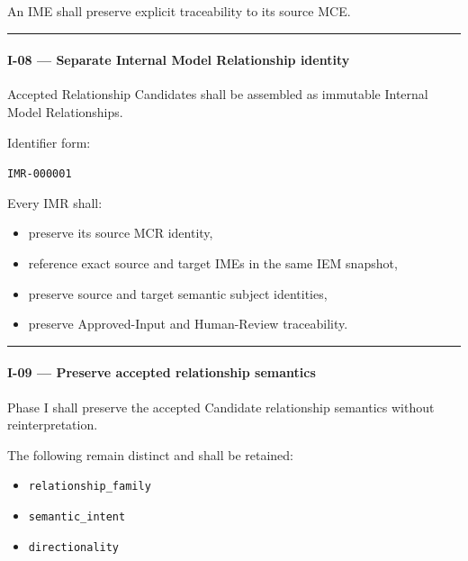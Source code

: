 An IME shall preserve explicit traceability to its source MCE.

\begin{center}\rule{0.5\linewidth}{0.5pt}\end{center}

\hypertarget{i-08--separate-internal-model-relationship-identity}{%
\paragraph{I-08 --- Separate Internal Model Relationship identity}\label{i-08--separate-internal-model-relationship-identity}}

Accepted Relationship Candidates shall be assembled as immutable Internal Model Relationships.

Identifier form:

\texttt{IMR-000001}

Every IMR shall:

\begin{itemize}
\tightlist
\item
  preserve its source MCR identity,
\item
  reference exact source and target IMEs in the same IEM snapshot,
\item
  preserve source and target semantic subject identities,
\item
  preserve Approved-Input and Human-Review traceability.
\end{itemize}

\begin{center}\rule{0.5\linewidth}{0.5pt}\end{center}

\hypertarget{i-09--preserve-accepted-relationship-semantics}{%
\paragraph{I-09 --- Preserve accepted relationship semantics}\label{i-09--preserve-accepted-relationship-semantics}}

Phase I shall preserve the accepted Candidate relationship semantics without reinterpretation.

The following remain distinct and shall be retained:

\begin{itemize}
\tightlist
\item
  \texttt{relationship\_family}
\item
  \texttt{semantic\_intent}
\item
  \texttt{directionality}
\end{itemize}

